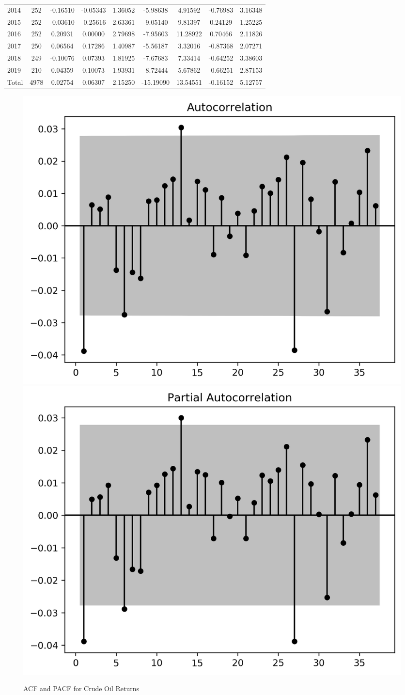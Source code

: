 \documentclass[12pt]{article}
\begin{document}
\begin{table}[H]
\begin{tabular}{l|c c c c c c c c}
2014 & 252 & -0.16510 & -0.05343 & 1.36052 & -5.98638 & 4.91592 & -0.76983 & 3.16348 \\
2015 & 252 & -0.03610 & -0.25616 & 2.63361 & -9.05140 & 9.81397 & 0.24129 & 1.25225 \\
2016 & 252 & 0.20931 & 0.00000 & 2.79698 & -7.95603 & 11.28922 & 0.70466 & 2.11826 \\
2017 & 250 & 0.06564 & 0.17286 & 1.40987 & -5.56187 & 3.32016 & -0.87368 & 2.07271 \\
2018 & 249 & -0.10076 & 0.07393 & 1.81925 & -7.67683 & 7.33414 & -0.64252 & 3.38603 \\
2019 & 210 & 0.04359 & 0.10073 & 1.93931 & -8.72444 & 5.67862 & -0.66251 & 2.87153 \\
			\midrule
Total & 4978 & 0.02754 & 0.06307 & 2.15250 & -15.19090 & 13.54551 & -0.16152 & 5.12757 \\
			\bottomrule
		\end{tabular}
	\end{table}

	\begin{figure}[H]
		\small
		\centering
		\caption{ACF and PACF for Crude Oil Returns}
		\includegraphics[width=0.45\linewidth]{figures/wti_summary/returns_acf.png}
		\includegraphics[width=0.45\linewidth]{figures/wti_summary/returns_pacf.png}
	\end{figure}
	
\end{document}

